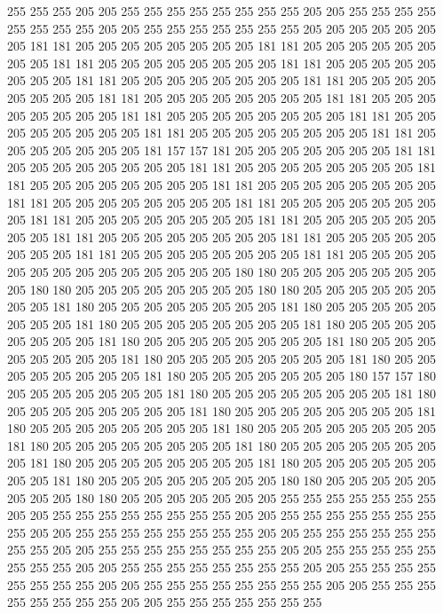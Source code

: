 255 255 255 205 205 255 255 255 255 255 255 255 255 205 205 255 255 255 255 255
255 255 255 205 205 255 255 255 255 255 255 255 205 205 205 205 205 205 205 181
181 205 205 205 205 205 205 205 205 181 181 205 205 205 205 205 205 205 205 181
181 205 205 205 205 205 205 205 205 181 181 205 205 205 205 205 205 205 205 181
181 205 205 205 205 205 205 205 205 181 181 205 205 205 205 205 205 205 205 181
181 205 205 205 205 205 205 205 205 181 181 205 205 205 205 205 205 205 205 181
181 205 205 205 205 205 205 205 205 181 181 205 205 205 205 205 205 205 205 181
181 205 205 205 205 205 205 205 205 181 181 205 205 205 205 205 205 205 181 157
157 181 205 205 205 205 205 205 205 181 181 205 205 205 205 205 205 205 205 181
181 205 205 205 205 205 205 205 205 181 181 205 205 205 205 205 205 205 205 181
181 205 205 205 205 205 205 205 205 181 181 205 205 205 205 205 205 205 205 181
181 205 205 205 205 205 205 205 205 181 181 205 205 205 205 205 205 205 205 181
181 205 205 205 205 205 205 205 205 181 181 205 205 205 205 205 205 205 205 181
181 205 205 205 205 205 205 205 205 181 181 205 205 205 205 205 205 205 205 181
181 205 205 205 205 205 205 205 205 205 205 205 205 205 205 180 180 205 205 205
205 205 205 205 205 180 180 205 205 205 205 205 205 205 205 180 180 205 205 205
205 205 205 205 205 181 180 205 205 205 205 205 205 205 205 181 180 205 205 205
205 205 205 205 205 181 180 205 205 205 205 205 205 205 205 181 180 205 205 205
205 205 205 205 205 181 180 205 205 205 205 205 205 205 205 181 180 205 205 205
205 205 205 205 205 181 180 205 205 205 205 205 205 205 205 181 180 205 205 205
205 205 205 205 205 181 180 205 205 205 205 205 205 205 180 157 157 180 205 205
205 205 205 205 205 181 180 205 205 205 205 205 205 205 205 181 180 205 205 205
205 205 205 205 205 181 180 205 205 205 205 205 205 205 205 181 180 205 205 205
205 205 205 205 205 181 180 205 205 205 205 205 205 205 205 181 180 205 205 205
205 205 205 205 205 181 180 205 205 205 205 205 205 205 205 181 180 205 205 205
205 205 205 205 205 181 180 205 205 205 205 205 205 205 205 181 180 205 205 205
205 205 205 205 205 180 180 205 205 205 205 205 205 205 205 180 180 205 205 205
205 205 205 205 255 255 255 255 255 255 255 205 205 255 255 255 255 255 255 255
255 205 205 255 255 255 255 255 255 255 255 205 205 255 255 255 255 255 255 255
255 205 205 255 255 255 255 255 255 255 255 205 205 255 255 255 255 255 255 255
255 205 205 255 255 255 255 255 255 255 255 205 205 255 255 255 255 255 255 255
255 205 205 255 255 255 255 255 255 255 255 205 205 255 255 255 255 255 255 255
255 205 205 255 255 255 255 255 255 255 255 205 205 255 255 255 255 255 255 255
